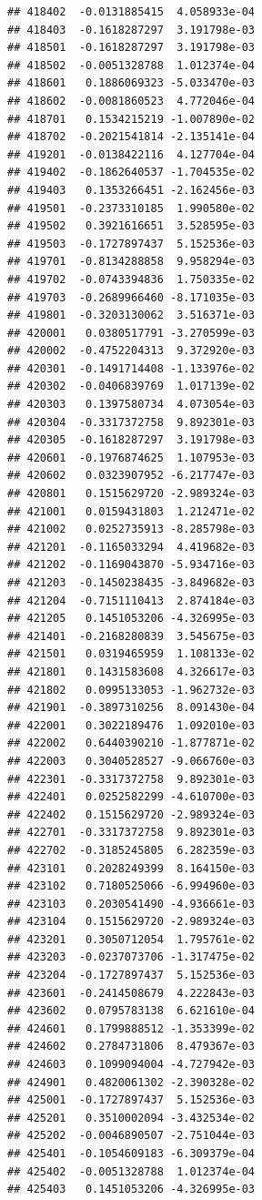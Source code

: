 \begin{frame}[fragile]
\begin{verbatim}
## 418402  -0.0131885415  4.058933e-04
## 418403  -0.1618287297  3.191798e-03
## 418501  -0.1618287297  3.191798e-03
## 418502  -0.0051328788  1.012374e-04
## 418601   0.1886069323 -5.033470e-03
## 418602  -0.0081860523  4.772046e-04
## 418701   0.1534215219 -1.007890e-02
## 418702  -0.2021541814 -2.135141e-04
## 419201  -0.0138422116  4.127704e-04
## 419402  -0.1862640537 -1.704535e-02
## 419403   0.1353266451 -2.162456e-03
## 419501  -0.2373310185  1.990580e-02
## 419502   0.3921616651  3.528595e-03
## 419503  -0.1727897437  5.152536e-03
## 419701  -0.8134288858  9.958294e-03
## 419702  -0.0743394836  1.750335e-02
## 419703  -0.2689966460 -8.171035e-03
## 419801  -0.3203130062  3.516371e-03
## 420001   0.0380517791 -3.270599e-03
## 420002  -0.4752204313  9.372920e-03
## 420301  -0.1491714408 -1.133976e-02
## 420302  -0.0406839769  1.017139e-02
## 420303   0.1397580734  4.073054e-03
## 420304  -0.3317372758  9.892301e-03
## 420305  -0.1618287297  3.191798e-03
## 420601  -0.1976874625  1.107953e-03
## 420602   0.0323907952 -6.217747e-03
## 420801   0.1515629720 -2.989324e-03
## 421001   0.0159431803  1.212471e-02
## 421002   0.0252735913 -8.285798e-03
## 421201  -0.1165033294  4.419682e-03
## 421202  -0.1169043870 -5.934716e-03
## 421203  -0.1450238435 -3.849682e-03
## 421204  -0.7151110413  2.874184e-03
## 421205   0.1451053206 -4.326995e-03
## 421401  -0.2168280839  3.545675e-03
## 421501   0.0319465959  1.108133e-02
## 421801   0.1431583608  4.326617e-03
## 421802   0.0995133053 -1.962732e-03
## 421901  -0.3897310256  8.091430e-04
## 422001   0.3022189476  1.092010e-03
## 422002   0.6440390210 -1.877871e-02
## 422003   0.3040528527 -9.066760e-03
## 422301  -0.3317372758  9.892301e-03
## 422401   0.0252582299 -4.610700e-03
## 422402   0.1515629720 -2.989324e-03
## 422701  -0.3317372758  9.892301e-03
## 422702  -0.3185245805  6.282359e-03
## 423101   0.2028249399  8.164150e-03
## 423102   0.7180525066 -6.994960e-03
## 423103   0.2030541490 -4.936661e-03
## 423104   0.1515629720 -2.989324e-03
## 423201   0.3050712054  1.795761e-02
## 423203  -0.0237073706 -1.317475e-02
## 423204  -0.1727897437  5.152536e-03
## 423601  -0.2414508679  4.222843e-03
## 423602   0.0795783138  6.621610e-04
## 424601   0.1799888512 -1.353399e-02
## 424602   0.2784731806  8.479367e-03
## 424603   0.1099094004 -4.727942e-03
## 424901   0.4820061302 -2.390328e-02
## 425001  -0.1727897437  5.152536e-03
## 425201   0.3510002094 -3.432534e-02
## 425202  -0.0046890507 -2.751044e-03
## 425401  -0.1054609183 -6.309379e-04
## 425402  -0.0051328788  1.012374e-04
## 425403   0.1451053206 -4.326995e-03

\end{verbatim}
\end{frame}

